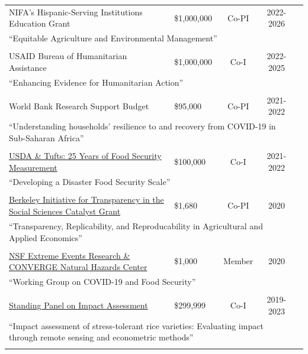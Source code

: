 \documentclass[letterpaper]{article}
\begin{document}
\begin{tabular}{llccc}
\multicolumn{1}{l}{NIFA’s Hispanic-Serving Institutions Education Grant}	& \$1,000,000 	& Co-PI			& 2022-2026 \\	
\multicolumn{4}{p{\linewidth}}{``Equitable Agriculture and Environmental Management''} \\
&&&& \\
		 
\multicolumn{1}{l}{USAID Bureau of Humanitarian Assistance }	& \$1,000,000	& Co-I			& 2022-2025 \\	
\multicolumn{4}{p{\linewidth}}{``Enhancing Evidence for Humanitarian Action''} \\
&&&& \\
		
\multicolumn{1}{l}{World Bank Research Support Budget}	& \$95,000 	& Co-PI			& 2021-2022 \\	
\multicolumn{4}{p{\linewidth}}{``Understanding households’ resilience to and recovery from COVID-19 in Sub-Saharan Africa''} \\
&&&& \\
		
\multicolumn{1}{l}{\href{https://sites.tufts.edu/foodsec25/files/2020/11/FoodSec_RFP_final.pdf}{USDA \& Tufts: 25 Years of Food Security Measurement}}	& \$100,000 	& Co-I			& 2021-2022 \\	
\multicolumn{4}{p{\linewidth}}{``Developing a Disaster Food Security Scale''} \\
&&&& \\
		
\multicolumn{1}{l}{\href{https://www.bitss.org/catalysts/announcing-new-catalyst-training-projects/}{Berkeley Initiative for Transparency in the Social Sciences Catalyst Grant}}	& \$1,680 	& Co-PI			& 2020 \\	
\multicolumn{4}{p{\linewidth}}{``Transparency, Replicability, and Reproducability in Agricultural and Applied Economics''} \\
&&&& \\
		
\multicolumn{1}{l}{\href{https://converge.colorado.edu/resources/covid-19/working-groups}{NSF Extreme Events Research \& CONVERGE Natural Hazards Center}}	& \$1,000 	& Member			& 2020 \\	
\multicolumn{4}{p{\linewidth}}{``Working Group on COVID-19 and Food Security''} \\
&&&& \\
		
\multicolumn{1}{l}{\href{https://www.cgiar.org/news-events/vacancy/call-for-expressions-of-interest-for-impact-studies-estimating-the-long-term-large-scale-impacts-of-cgiar-research-on-development-outcomes/}{Standing Panel on Impact Assessment}}	& \$299,999 	& Co-I			& 2019-2023 \\	
\multicolumn{4}{p{\linewidth}}{``Impact assessment of stress-tolerant rice varieties: Evaluating impact through remote sensing and econometric methods''} \\
&&&& \\
		

\end{tabular}
\end{document}
